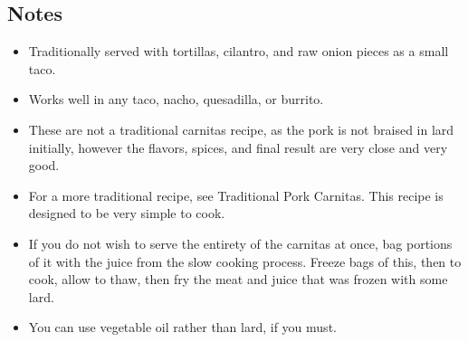 \begin{multicols}{2}
\subsection*{Notes}
\begin{itemize}
    \item Traditionally served with tortillas, cilantro, and raw onion pieces as a small taco.
    \item Works well in any taco, nacho, quesadilla, or burrito.
    \item These are not a traditional carnitas recipe, as the pork is not braised in lard initially, however the flavors, spices, and final result are very close and very good.
    \item For a more traditional recipe, see Traditional Pork Carnitas. This recipe is designed to be very simple to cook.
    \item If you do not wish to serve the entirety of the carnitas at once, bag portions of it with the juice from the slow cooking process. Freeze bags of this, then to cook, allow to thaw, then fry the meat and juice that was frozen with some lard.
    \item You can use vegetable oil rather than lard, if you must.

\end{itemize}
\end{multicols}
\clearpage